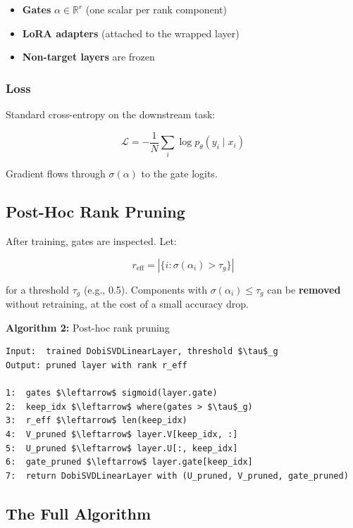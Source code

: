 \begin{itemize}
\item \textbf{Gates} $\alpha \in \mathbb{R}^r$ (one scalar per rank component)
\item \textbf{LoRA adapters} (attached to the wrapped layer)
\item \textbf{Non-target layers} are frozen

\end{itemize}
\subsubsection{Loss}

Standard cross-entropy on the downstream task:

\[
\mathcal{L} = -\frac{1}{N} \sum_i \log p_\theta(y_i \mid x_i)
\tag{4.10}
\]

Gradient flows through $\sigma(\alpha)$ to the gate logits.

\subsection{Post-Hoc Rank Pruning}

After training, gates are inspected. Let:

\[
r_\text{eff} = \left|\{i : \sigma(\alpha_i) > \tau_g\}\right|
\tag{4.11}
\]

for a threshold $\tau_g$ (e.g., 0.5). Components with $\sigma(\alpha_i) \leq \tau_g$ 
can be \textbf{removed} without retraining, at the cost of a small accuracy drop.

\textbf{Algorithm 2:} Post-hoc rank pruning
\begin{lstlisting}
Input:  trained DobiSVDLinearLayer, threshold $\tau$_g
Output: pruned layer with rank r_eff

1:  gates $\leftarrow$ sigmoid(layer.gate)
2:  keep_idx $\leftarrow$ where(gates > $\tau$_g)
3:  r_eff $\leftarrow$ len(keep_idx)
4:  V_pruned $\leftarrow$ layer.V[keep_idx, :]
5:  U_pruned $\leftarrow$ layer.U[:, keep_idx]
6:  gate_pruned $\leftarrow$ layer.gate[keep_idx]
7:  return DobiSVDLinearLayer with (U_pruned, V_pruned, gate_pruned)
\end{lstlisting}

\subsection{The Full Algorithm}


